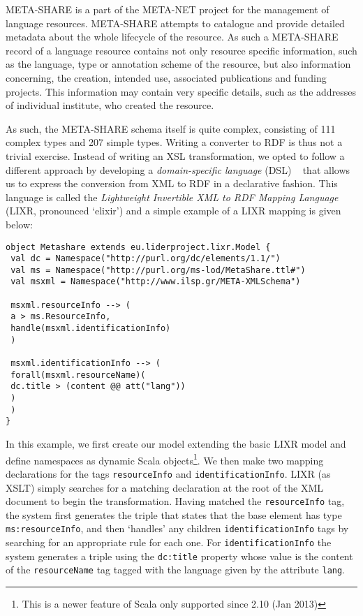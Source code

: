 \documentclass{acm_proc_article-sp}
\begin{document}
META-SHARE is a part of the META-NET project for the management of language resources. 
META-SHARE attempts to catalogue and provide detailed metadata about the whole
lifecycle of the resource. As such a META-SHARE record of a language resource
contains not only resource specific information, such as the language, type
or annotation scheme of the resource, but also information concerning, the
creation, intended use, associated publications and funding projects. This 
information may contain very specific details, such as the addresses of individual
institute, who created the resource.

As such, the META-SHARE schema itself is quite complex, consisting of 111 complex types
and 207 simple types.
Writing a\textsc{} converter to RDF is thus not a trivial exercise. Instead of writing an
XSL transformation, we opted to follow a different approach by developing a
\emph{domain-specific language} (DSL) ~\cite{fowler2010domain} that allows us to express the conversion from XML to RDF in a declarative fashion.
This language is called the \textit{Lightweight Invertible XML to RDF Mapping
Language} (LIXR, pronounced `elixir') and a simple example of a
LIXR mapping is given below:

{\scriptsize
\begin{verbatim}
object Metashare extends eu.liderproject.lixr.Model {
 val dc = Namespace("http://purl.org/dc/elements/1.1/")
 val ms = Namespace("http://purl.org/ms-lod/MetaShare.ttl#")
 val msxml = Namespace("http://www.ilsp.gr/META-XMLSchema")

 msxml.resourceInfo --> (
 a > ms.ResourceInfo,
 handle(msxml.identificationInfo)
 )

 msxml.identificationInfo --> (
 forall(msxml.resourceName)(
 dc.title > (content @@ att("lang"))
 )
 )
}
\end{verbatim}}
In this example, we first create our model extending the basic LIXR model and
define namespaces as dynamic Scala objects\footnote{This is a newer feature of
Scala only supported since 2.10 (Jan 2013)}. We then make two mapping
declarations for the tags {\tt resourceInfo} and {\tt identifi\-cationInfo}. LIXR (as
XSLT) simply searches for a matching declaration at the root of the XML document
to begin the transformation. Having matched the {\tt resourceInfo} tag, the system
first generates the triple that states that the base element has type
{\tt ms:resourceInfo}, and then `handles' any children {\tt identi\-ficationInfo} tags by
searching for an appropriate rule for each one. For {\tt identificationInfo} the
system generates a triple using the {\tt dc:title} property whose value is the
content of the {\tt resourceName} tag tagged with the language given by the
attribute {\tt lang}.
\end{document}
